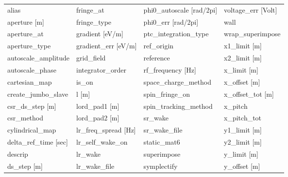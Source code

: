  \begin{tabular}{llll} \toprule
alias                            & fringe_at                        & phi0_autoscale [rad/2pi]         & voltage_err [Volt]               \\
aperture [m]                     & fringe_type                      & phi0_err [rad/2pi]               & wall                             \\
aperture_at                      & gradient [eV/m]                  & ptc_integration_type             & wrap_superimpose                 \\
aperture_type                    & gradient_err [eV/m]              & ref_origin                       & x1_limit [m]                     \\
autoscale_amplitude              & grid_field                       & reference                        & x2_limit [m]                     \\
autoscale_phase                  & integrator_order                 & rf_frequency [Hz]                & x_limit [m]                      \\
cartesian_map                    & is_on                            & space_charge_method              & x_offset [m]                     \\
create_jumbo_slave               & l [m]                            & spin_fringe_on                   & x_offset_tot [m]                 \\
csr_ds_step [m]                  & lord_pad1 [m]                    & spin_tracking_method             & x_pitch                          \\
csr_method                       & lord_pad2 [m]                    & sr_wake                          & x_pitch_tot                      \\
cylindrical_map                  & lr_freq_spread [Hz]              & sr_wake_file                     & y1_limit [m]                     \\
delta_ref_time [sec]             & lr_self_wake_on                  & static_mat6                      & y2_limit [m]                     \\
descrip                          & lr_wake                          & superimpose                      & y_limit [m]                      \\
ds_step [m]                      & lr_wake_file                     & symplectify                      & y_offset [m]                     \\

\end{tabular}
